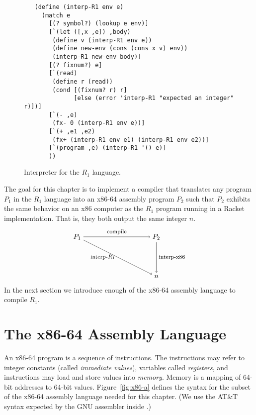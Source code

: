 \documentclass[11pt]{book}
\begin{document}
\begin{figure}[tbp]
\begin{lstlisting}
   (define (interp-R1 env e)
     (match e
       [(? symbol?) (lookup e env)]
       [`(let ([,x ,e]) ,body)
        (define v (interp-R1 env e))
        (define new-env (cons (cons x v) env))
        (interp-R1 new-env body)]
       [(? fixnum?) e]
       [`(read)
        (define r (read))
        (cond [(fixnum? r) r]
              [else (error 'interp-R1 "expected an integer" r)])]
       [`(- ,e)
        (fx- 0 (interp-R1 env e))]
       [`(+ ,e1 ,e2)
        (fx+ (interp-R1 env e1) (interp-R1 env e2))]
       [`(program ,e) (interp-R1 '() e)]
       ))
\end{lstlisting}
\caption{Interpreter for the $R_1$ language.}
\label{fig:interp-R1}
\end{figure}



The goal for this chapter is to implement a compiler that translates
any program $P_1$ in the $R_1$ language into an x86-64 assembly
program $P_2$ such that $P_2$ exhibits the same behavior on an x86
computer as the $R_1$ program running in a Racket implementation.
That is, they both output the same integer $n$.
\[
\begin{tikzpicture}[baseline=(current  bounding  box.center)]
 \node (p1) at (0,  0)   {$P_1$};
 \node (p2) at (4,  0)   {$P_2$};
 \node (o)  at (4, -2) {$n$};

 \path[->] (p1) edge [above] node {\footnotesize compile} (p2);
 \path[->] (p1) edge [left]  node {\footnotesize interp-$R_1$} (o);
 \path[->] (p2) edge [right] node {\footnotesize interp-x86} (o);
\end{tikzpicture}
\]
In the next section we introduce enough of the x86-64 assembly
language to compile $R_1$.

\section{The x86-64 Assembly Language}
\label{sec:x86-64}

An x86-64 program is a sequence of instructions. The instructions may
refer to integer constants (called \emph{immediate values}), variables
called \emph{registers}, and instructions may load and store values
into \emph{memory}.  Memory is a mapping of 64-bit addresses to 64-bit
values. Figure~\ref{fig:x86-a} defines the syntax for the subset of
the x86-64 assembly language needed for this chapter.  (We use the
AT\&T syntax expected by the GNU assembler inside .)
\end{document}
